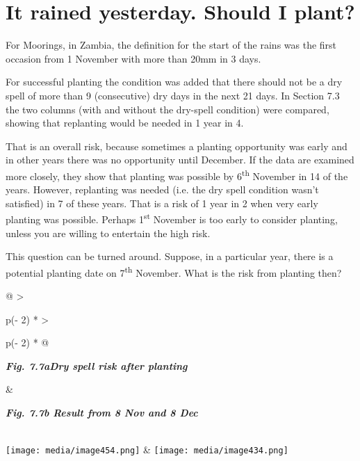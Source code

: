 \documentclass[
  letterpaper,
  DIV=11,
  numbers=noendperiod]{scrreprt}
\begin{document}
\section{It rained yesterday. Should I
plant?}\label{it-rained-yesterday.-should-i-plant}

For Moorings, in Zambia, the definition for the start of the rains was
the first occasion from 1 November with more than 20mm in 3 days.

For successful planting the condition was added that there should not be
a dry spell of more than 9 (consecutive) dry days in the next 21 days.
In Section 7.3 the two columns (with and without the dry-spell
condition) were compared, showing that replanting would be needed in 1
year in 4.

That is an overall risk, because sometimes a planting opportunity was
early and in other years there was no opportunity until December. If the
data are examined more closely, they show that planting was possible by
6\textsuperscript{th} November in 14 of the years. However, replanting
was needed (i.e. the dry spell condition wasn't satisfied) in 7 of these
years. That is a risk of 1 year in 2 when very early planting was
possible. Perhaps 1\textsuperscript{st} November is too early to
consider planting, unless you are willing to entertain the high risk.

This question can be turned around. Suppose, in a particular year, there
is a potential planting date on 7\textsuperscript{th} November. What is
the risk from planting then?

\begin{longtable}[]{@{}
  >{\raggedright\arraybackslash}p{(\columnwidth - 2\tabcolsep) * }
  >{\raggedright\arraybackslash}p{(\columnwidth - 2\tabcolsep) * }@{}}
\toprule\noalign{}
\begin{minipage}[b]{\linewidth}\raggedright
\textbf{\emph{Fig. 7.7aDry spell risk after planting}}
\end{minipage} & \begin{minipage}[b]{\linewidth}\raggedright
\textbf{\emph{Fig. 7.7b Result from 8 Nov and 8 Dec}}
\end{minipage} \\
\midrule\noalign{}
\endhead
\bottomrule\noalign{}
\endlastfoot
\texttt{[image: media/image454.png]} &
\texttt{[image: media/image434.png]} \\
\end{longtable}
\end{document}
